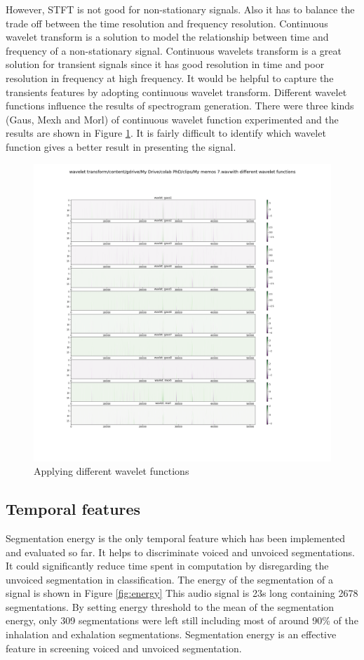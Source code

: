 However, STFT is not good for non-stationary signals. Also it has to balance the trade off between the time resolution and frequency resolution. Continuous wavelet transform is a solution to model the relationship between time and frequency of a non-stationary signal. Continuous wavelets transform is a great solution for transient signals since it has good resolution in time and poor resolution in frequency at high frequency. It would be helpful to capture the transients features by adopting continuous wavelet transform. Different wavelet functions influence the results of spectrogram generation. There were three kinds (Gaus, Mexh and Morl) of continuous wavelet function experimented and the results are shown in Figure \ref{fig:wavelet_functions}. It is fairly difficult to identify which wavelet function gives a better result in presenting the signal.
\begin{figure}[h]
    \centerline{\includegraphics[scale=0.25]{figures/wavelet_trans_wav_func.png}}
    \caption{Applying different wavelet functions}
    \label{fig:wavelet_functions}
\end{figure}

\subsection{Temporal features}
Segmentation energy is the only temporal feature which has been implemented and evaluated so far. It helps to discriminate voiced and unvoiced segmentations. It could significantly reduce time spent in computation by disregarding the unvoiced segmentation in classification. The energy of the segmentation of a signal is shown in Figure \ref{fig:energy} This audio signal is 23s long containing 2678 segmentations. By setting energy threshold to the mean of the segmentation energy, only 309 segmentations were left still including most of around 90\% of the inhalation and exhalation segmentations. 
Segmentation energy is an effective feature in screening voiced and unvoiced segmentation. 


